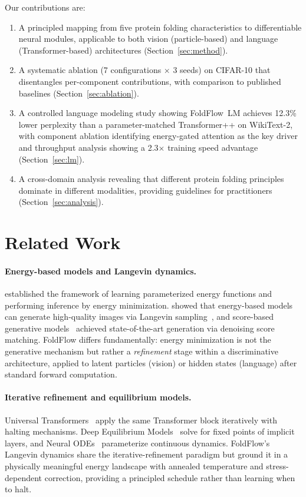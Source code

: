 \documentclass[10pt]{article}
\begin{document}
Our contributions are:
\begin{enumerate}
  \item A principled mapping from five protein folding characteristics
    to differentiable neural modules, applicable to both vision
    (particle-based) and language (Transformer-based)
    architectures (Section~\ref{sec:method}).
  \item A systematic ablation (7 configurations $\times$ 3 seeds) on
    CIFAR-10 that disentangles per-component contributions, with
    comparison to published baselines (Section~\ref{sec:ablation}).
  \item A controlled language modeling study showing FoldFlow~LM
    achieves 12.3\% lower perplexity than a parameter-matched
    Transformer++ on WikiText-2, with component ablation identifying
    energy-gated attention as the key driver and throughput analysis
    showing a 2.3$\times$ training speed advantage
    (Section~\ref{sec:lm}).
  \item A cross-domain analysis revealing that different protein
    folding principles dominate in different modalities, providing
    guidelines for practitioners (Section~\ref{sec:analysis}).
\end{enumerate}

\section{Related Work}
\label{sec:related}

\paragraph{Energy-based models and Langevin dynamics.}
\citet{lecun2006tutorial} established the framework of learning
parameterized energy functions and performing inference by energy
minimization.  \citet{du2019implicit} showed that energy-based models
can generate high-quality images via Langevin
sampling~\citep{welling2011bayesian}, and score-based generative
models~\citep{song2019generative} achieved state-of-the-art generation
via denoising score matching.  FoldFlow differs fundamentally: energy
minimization is not the generative mechanism but rather a
\emph{refinement} stage within a discriminative architecture, applied to
latent particles (vision) or hidden states (language) after standard
forward computation.

\paragraph{Iterative refinement and equilibrium models.}
Universal Transformers~\citep{dehghani2019universal} apply the same
Transformer block iteratively with halting mechanisms.  Deep Equilibrium
Models~\citep{bai2019deep} solve for fixed points of implicit layers,
and Neural ODEs~\citep{chen2018neural} parameterize continuous dynamics.
FoldFlow's Langevin dynamics share the iterative-refinement paradigm
but ground it in a physically meaningful energy landscape with annealed
temperature and stress-dependent correction, providing a principled
schedule rather than learning when to halt.
\end{document}

